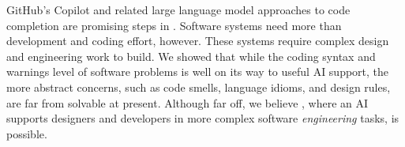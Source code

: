 \label{conclusion}
GitHub's Copilot and related large language model approaches to code completion are promising steps in \AIDE{}. Software systems need more than development and coding effort, however. 
These systems require complex design and engineering work to build. 
We showed that while the coding syntax and warnings level of software problems is well on its way to useful AI support, the more abstract concerns, such as code smells, language idioms, and design rules, are far from solvable at present.
Although far off, we believe \AISE{}, where an AI supports designers and developers in more complex software \emph{engineering} tasks, is possible.
